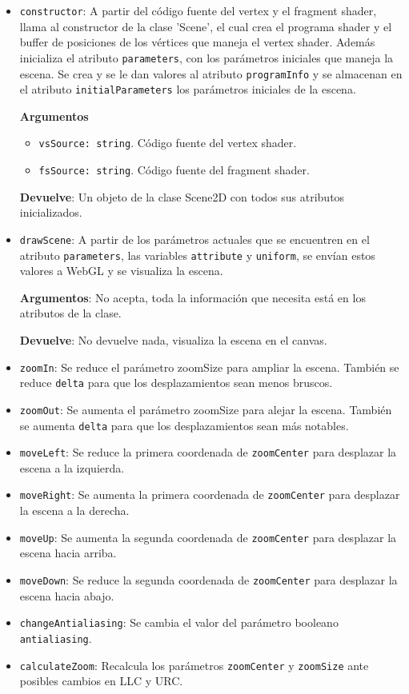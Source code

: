 \begin{itemize}
    \item \verb|constructor|: A partir del código fuente del vertex y el fragment shader, llama al constructor de la clase 'Scene', el cual crea el programa shader y el buffer de posiciones de los vértices que maneja el vertex shader. Además inicializa el atributo \verb|parameters|, con los parámetros iniciales que maneja la escena. Se crea y se le dan valores al atributo \verb|programInfo| y se almacenan en el atributo \verb|initialParameters| los parámetros iniciales de la escena.

    \textbf{Argumentos}

    \begin{itemize}
        \item \verb|vsSource: string|. Código fuente del vertex shader.
        \item \verb|fsSource: string|. Código fuente del fragment shader.
    \end{itemize}
    
    \textbf{Devuelve}: Un objeto de la clase Scene2D con todos sus atributos inicializados.
    
    \item \verb|drawScene|: A partir de los parámetros actuales que se encuentren en el atributo \verb|parameters|, las variables \verb|attribute| y \verb|uniform|, se envían estos valores a WebGL y se visualiza la escena.
    
    \textbf{Argumentos}: No acepta, toda la información que necesita está en los atributos de la clase.
    
    \textbf{Devuelve}: No devuelve nada, visualiza la escena en el canvas.
    \item \verb|zoomIn|: Se reduce el parámetro zoomSize para ampliar la escena. También se reduce \verb|delta| para que los desplazamientos sean menos bruscos.
    \item \verb|zoomOut|: Se aumenta el parámetro zoomSize para alejar la escena. También se aumenta \verb|delta| para que los desplazamientos sean más notables.
    \item \verb|moveLeft|: Se reduce la primera coordenada de \verb|zoomCenter| para desplazar la escena a la izquierda.
    \item \verb|moveRight|: Se aumenta la primera coordenada de \verb|zoomCenter| para desplazar la escena a la derecha.
    \item \verb|moveUp|: Se aumenta la segunda coordenada de \verb|zoomCenter| para desplazar la escena hacia arriba.
    \item \verb|moveDown|: Se reduce la segunda coordenada de \verb|zoomCenter| para desplazar la escena hacia abajo.
    \item \verb|changeAntialiasing|: Se cambia el valor del parámetro booleano \verb|antialiasing|.
    \item \verb|calculateZoom|: Recalcula los parámetros \verb|zoomCenter| y \verb|zoomSize| ante posibles cambios en LLC y URC.
\end{itemize}

